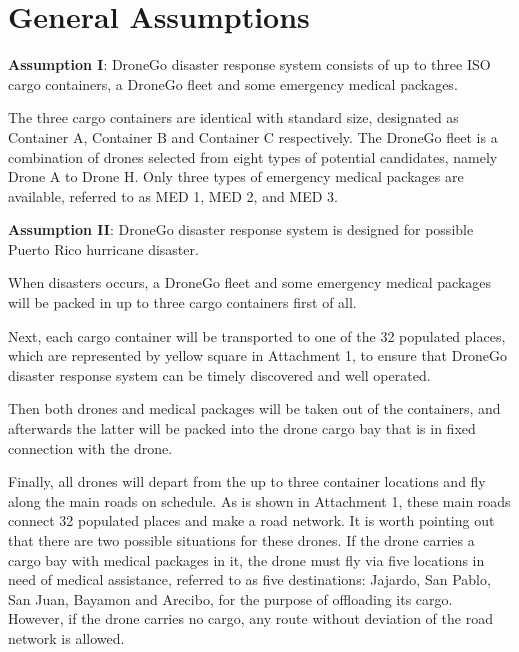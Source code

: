 \documentclass{mcmthesis}
\begin{document}
\section{General Assumptions}
\textbf{Assumption I}: DroneGo disaster response system consists of up to three ISO cargo containers, a DroneGo fleet and some emergency medical packages. 

\noindent The three cargo containers are identical with standard size, designated as Container A, Container B and Container C respectively. The DroneGo fleet is a combination of drones selected from eight types of potential candidates, namely Drone A to Drone H. Only three types of emergency medical packages are available, referred to as MED 1, MED 2, and MED 3.

\noindent\textbf{Assumption II}: DroneGo disaster response system is designed for possible Puerto Rico hurricane disaster. 

\noindent When disasters occurs, a DroneGo fleet and some emergency medical packages will be packed in up to three cargo containers first of all. 

\noindent Next, each cargo container will be transported to one of the 32 populated places, which are represented by yellow square in Attachment 1, to ensure that DroneGo disaster response system can be timely discovered and well operated. 

\noindent Then both drones and medical packages will be taken out of the containers, and afterwards the latter will be packed into the drone cargo bay that is in fixed connection with the drone. 

\noindent Finally, all drones will depart from the up to three container locations and fly along the main roads on schedule. As is shown in Attachment 1, these main roads connect 32 populated places and make a road network. It is worth pointing out that there are two possible situations for these drones. If the drone carries a cargo bay with medical packages in it, the drone must fly via five locations in need of medical assistance, referred to as five destinations: Jajardo, San Pablo, San Juan, Bayamon and Arecibo, for the purpose of offloading its cargo. However, if the drone carries no cargo, any route without deviation of the road network is allowed.
\end{document}
